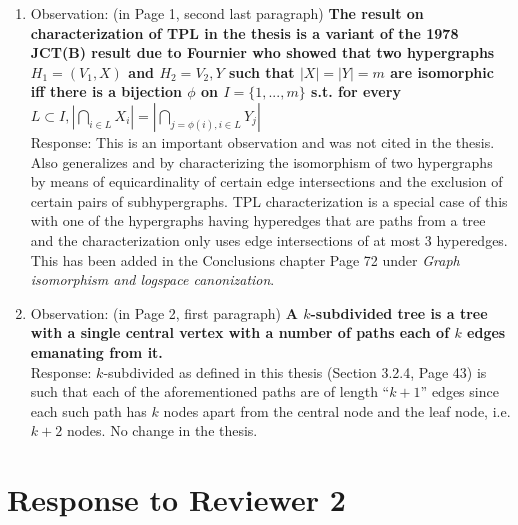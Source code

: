 \documentclass{article}
\begin{document}
\begin{enumerate}
\item Observation: (in Page 1, second last paragraph) {\bf The result
    on characterization of TPL in the thesis is a variant of the 1978
    JCT(B) result due to Fournier who showed that two hypergraphs $H_1
    = (V_1, X)$ and $H_2 = V_2, Y$ such that $|X| = |Y| = m$ are
    isomorphic iff there is a bijection $\phi$ on $I = \{1, ... , m\}$
    s.t. for every $L \subset I,
    |\bigcap_{i \in L}X_i| = |\bigcap_{j=\phi(i),i \in L}Y_j|$} \\
  Response: This is an important observation and was not cited in the
  thesis. Also \cite{f80} generalizes \cite{br72} and \cite{fg65} by
  characterizing the isomorphism of two hypergraphs by means of
  equicardinality of certain edge intersections and the exclusion of
  certain pairs of subhypergraphs. TPL characterization is a special
  case of this with one of the hypergraphs having hyperedges that are
  paths from a tree and the characterization only uses edge
  intersections of at most 3 hyperedges. This has been added in the
  Conclusions chapter Page 72 under {\em Graph isomorphism and
    logspace canonization}.

\item Observation: (in Page 2, first paragraph) {\bf A $k$-subdivided
    tree is a tree with a single central vertex with a number of paths
    each of $k$ edges emanating from it.}\\
  Response: $k$-subdivided as defined in this thesis (Section 3.2.4,
  Page 43) is such that each of the aforementioned paths are of length
  ``$k+1$'' edges since each such path has $k$ nodes apart from the
  central node and the leaf node, i.e.  $k+2$ nodes. No change in the
  thesis.
\end{enumerate}


\section{Response to Reviewer 2}
\end{document}
